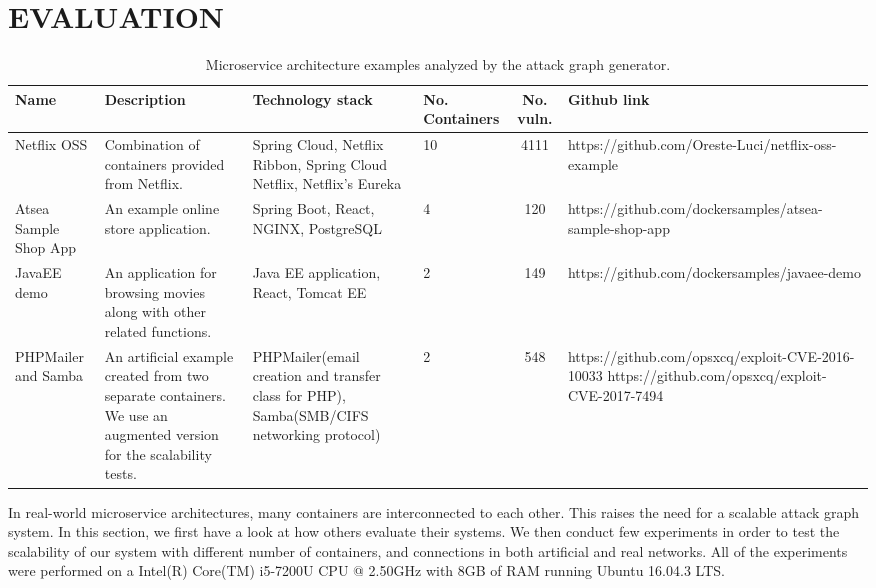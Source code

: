 \section{EVALUATION}

\begin{table*}
	\begin{center}
		\begin{tabular}{ |p{20mm}|p{25mm}|p{20mm}|p{10mm}|c|p{60mm}| } 
			\hline
			Name & Description & Technology stack & No. Containers & No. vuln. & Github link \\\hline 
			
			Netflix OSS & Combination of containers provided from Netflix. & Spring Cloud, Netflix Ribbon, Spring Cloud Netflix, Netflix's Eureka & 10 & 4111 & https://github.com/Oreste-Luci/netflix-oss-example \\\hline
			
			Atsea Sample Shop App & An example online store application. & Spring Boot, React, NGINX, PostgreSQL & 4 & 120 &  https://github.com/dockersamples/atsea-sample-shop-app \\\hline
			
			JavaEE demo & An application for browsing movies along with other related functions. & Java EE application, React, Tomcat EE & 2 & 149 &  https://github.com/dockersamples/javaee-demo \\\hline
			
			PHPMailer and Samba & An artificial example created from two separate containers. We use an augmented version for the scalability tests. & PHPMailer(email creation and transfer class for PHP), Samba(SMB/CIFS networking protocol) & 2 & 548 &  https://github.com/opsxcq/exploit-CVE-2016-10033
			https://github.com/opsxcq/exploit-CVE-2017-7494 \\\hline
			
			
			\hline
		\end{tabular}
	\end{center}
	
	\caption{Microservice architecture examples analyzed by the attack graph generator.}
	\label{table_technologies}
	
\end{table*}

	
In real-world microservice architectures, many containers are interconnected to each other. This raises the need for a scalable attack graph system. In this section, we first have a look at how others evaluate their systems. We then conduct few experiments in order to test the scalability of our system with different number of containers, and connections in both artificial and real networks. All of the experiments were performed on a Intel(R) Core(TM) i5-7200U CPU @ 2.50GHz with 8GB of RAM running Ubuntu 16.04.3 LTS.

